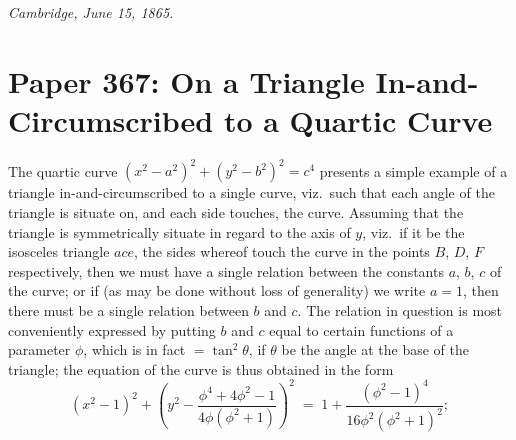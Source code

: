 \documentclass[11pt]{article}
\begin{document}
\medskip
\noindent\textit{Cambridge, June 15, 1865.}

\bigskip

\section*{Paper 367: On a Triangle In-and-Circumscribed to a Quartic Curve}

\medskip{}

\medskip
The quartic curve $(x^{2} - a^{2})^{2} + (y^{2} - b^{2})^{2} = c^{4}$ presents a simple example of a triangle in-and-circumscribed to a single curve, viz.\ such that each angle of the triangle is situate on, and each side touches, the curve. Assuming that the triangle is symmetrically situate in regard to the axis of $y$, viz.\ if it be the isosceles triangle $ace$, the sides whereof touch the curve in the points $B$, $D$, $F$ respectively, then we must have a single relation between the constants $a$, $b$, $c$ of the curve; or if (as may be done without loss of generality) we write $a=1$, then there must be a single relation between $b$ and $c$. The relation in question is most conveniently expressed by putting $b$ and $c$ equal to certain functions of a parameter $\phi$, which is in fact $=\tan^{2}\theta$, if $\theta$ be the angle at the base of the triangle; the equation of the curve is thus obtained in the form
\[
(x^{2} - 1)^{2} + \left( y^{2} - \frac{\phi^{4} + 4\phi^{2} - 1}{4\phi(\phi^{2} + 1)} \right)^{2} \;=\; 1 + \frac{(\phi^{2} - 1)^{4}}{16\phi^{2}(\phi^{2} + 1)^{2}};
\]

\medskip
\begin{center}
\end{center}
\end{document}
